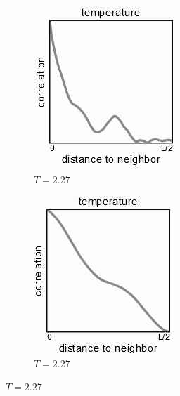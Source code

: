 \documentclass[]{article}
\begin{document}
\begin{figure}[H]
	\caption{Correlation close to $R=T_c$}\label{fig:correlation1}
	\begin{subfigure}[t]{0.24\textwidth}
		\caption{$T=2.27$}
		\includegraphics[width=\textwidth]{ising-correlation1}
	\end{subfigure}
	\begin{subfigure}[t]{0.24\textwidth}
		\caption{$T=2.27$}
		\includegraphics[width=\textwidth]{ising-correlation2}

\end{subfigure}
\end{figure}
\end{document}
